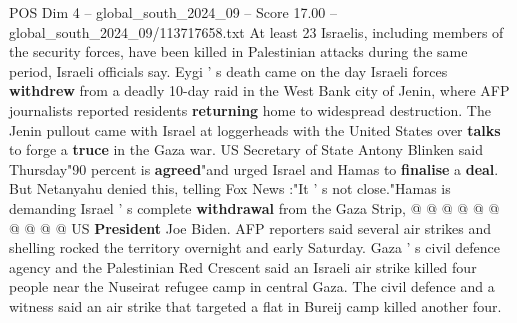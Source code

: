\begin{textsample}{POS Dim 4 – global\_south\_2024\_09 – Score 17.00 – global\_south\_2024\_09/113717658.txt}
At least 23 Israelis, including members of the security forces, have been killed in Palestinian attacks during the same period, Israeli officials say.
Eygi ' s death came on the day Israeli forces \textbf{withdrew} from a deadly 10-day raid in the West Bank city of Jenin, where AFP journalists reported residents \textbf{returning} home to widespread destruction.
The Jenin pullout came with Israel at loggerheads with the United States over \textbf{talks} to forge a \textbf{truce} in the Gaza war.
US Secretary of State Antony Blinken said Thursday"90 percent is \textbf{agreed}"and urged Israel and Hamas to \textbf{finalise} a \textbf{deal}.
But Netanyahu denied this, telling Fox News :"It ' s not close."Hamas is demanding Israel ' s complete \textbf{withdrawal} from the Gaza Strip, @ @ @ @ @ @ @ @ @ @ US \textbf{President} Joe Biden.
AFP reporters said several air strikes and shelling rocked the territory overnight and early Saturday.
Gaza ' s civil defence agency and the Palestinian Red Crescent said an Israeli air strike killed four people near the Nuseirat refugee camp in central Gaza.
The civil defence and a witness said an air strike that targeted a flat in Bureij camp killed another four.

\end{textsample}
